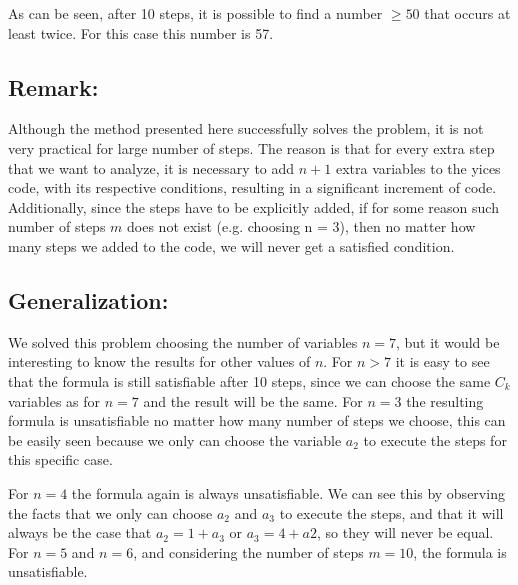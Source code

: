 As can be seen, after 10 steps, it is possible to find a number $\geq 50$ that occurs at least twice. For this case this number is 57.

\subsection*{Remark:}

Although the method presented here successfully solves the problem, it is not very practical for large number of steps. The reason is that for every extra step that we want to analyze, it is necessary to add $n+1$ extra variables to the yices code, with its respective conditions, resulting in a significant increment of code. Additionally, since the steps have to be explicitly added, if for some reason such number of steps $m$ does not exist (e.g. choosing n = 3), then no matter how many steps we added to the code, we will never get a satisfied condition.

\subsection*{Generalization:}

We solved this problem choosing the number of variables $n = 7$, but it would be interesting to know the results for other values of $n$.  For $n>7$ it is easy to see that the formula is still satisfiable after 10 steps, since we can choose the same $C_{k}$ variables as for $n=7$ and the result will be the same.
For $n = 3$ the resulting formula is unsatisfiable no matter how many number of steps we choose, this can be easily seen because we only can choose the variable $a_{2}$ to execute the steps for this specific case.

For $n=4$ the formula again is always unsatisfiable. We can see this by observing the facts that we only can choose $a_{2}$ and $a_{3}$ to execute the steps, and that it will always be the case that $a_{2} = 1 + a_{3}$ or $a_{3} = 4 + a{2}$, so they will never be equal. For $n=5$ and $n=6$, and considering the number of steps $m=10$, the formula is unsatisfiable. 